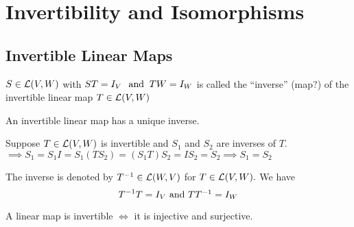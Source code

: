\section{Invertibility and Isomorphisms}

\subsection{Invertible Linear Maps}
  \setcounter{thm}{58}
  \begin{mydef} 
    $S\in {\mathcal{L}(V,W)}$ with $ST=I_V \;\;\, \text{and}\;\; TW = I_W$ is called the ``inverse'' (map?) of the invertible linear map $T \in {\mathcal{L}(V,W)}$
  \end{mydef}

  \begin{thm} 
    An invertible  linear map has a unique inverse.
  \end{thm}
  \begin{prf}
    Suppose $T\in {\mathcal{L}(V,W)}$ is invertible and $S_1$ and $S_2$ are inverses of $T$. $\implies S_1 = S_1 I = S_1 (T S_2) = (S_1 T) S_2 = I S_2 = S_2 \implies S_1 = S_2$ 
  \end{prf}

  \begin{mydef} [notation $T^{-1}$]
    The inverse is denoted by $T^{-1}\in \mathcal{L}(W,V)$ for $T\in \mathcal{L}(V,W).$ We have
    \begin{equation}
      T^{-1}T=I_V$ and $T T^{-1} = I_W
    \end{equation}
  \end{mydef}

  \begin{thm} 
    A linear map is invertible $\iff$ it is injective and surjective.
  \end{thm}

